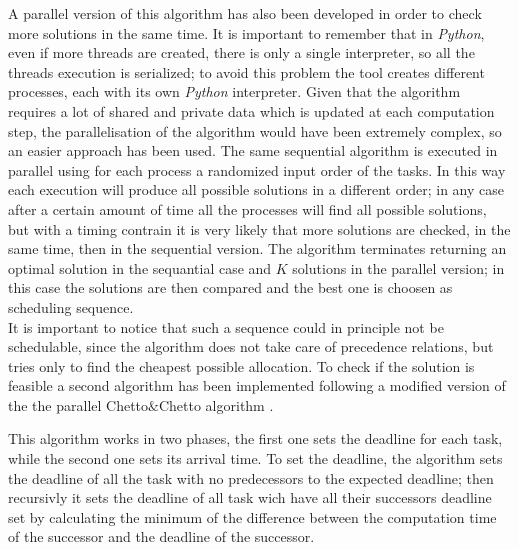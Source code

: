 \documentclass[a4paper,11pt,oneside]{book}
\begin{document}
A parallel version of this algorithm has also been developed in order to check more solutions in the same time. It is important to remember that in \emph{Python}, even if more threads are created, there is only a single interpreter, so all the threads execution is serialized; to avoid this problem the tool creates different processes, each with its own \emph{Python} interpreter. Given that the algorithm requires a lot of shared and private data which is updated at each computation step, the parallelisation of the algorithm would have been extremely complex, so an easier approach has been used. The same sequential algorithm is executed in parallel using for each process a randomized input order of the tasks. In this way each execution will produce all possible solutions in a different order; in any case after a certain amount of time all the processes will find all possible solutions, but with a timing contrain it is very likely that  more solutions are checked, in the same time, then in the sequential version. The algorithm terminates returning an optimal solution in the sequantial case and $K$ solutions in the parallel version; in this case the solutions are then compared and the best one is choosen as scheduling sequence. \\
It is important to notice that such a sequence could in principle not be schedulable, since the algorithm does not take care of precedence relations, but tries only to find the cheapest possible allocation. To check if the solution is feasible a second algorithm has been implemented following a modified version of the the parallel Chetto$\&$Chetto algorithm \cite{bbw2}.

This algorithm works in two phases, the first one sets the deadline for each task, while the second one sets its arrival time. To set the deadline, the algorithm sets the deadline of all the task with no predecessors to the expected deadline; then recursivly it sets the deadline of all task wich have all their successors deadline set by calculating the minimum of the difference between the computation time of the successor and the deadline of the successor. 
\end{document}
